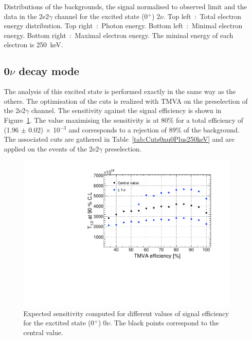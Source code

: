 \documentclass[main.tex]{subfiles}
\begin{document}
Distributions of the backgrounds, the signal normalised to observed limit and the data in the 2e2$\gamma$ channel for the excited state (0$^+$) 2$\nu$. Top left~:~Total electron energy distribution. Top right~:~Photon energy. Bottom left~:~Minimal electron energy. Bottom right~:~Maximal electron energy. The mininal energy of each electron is 250~keV.


\FloatBarrier


\subsection{0$\nu$ decay mode}\label{Analysisbb0nu0}


\NI The analysis of this excited state is performed exactly in the same way as the others. The optimisation of the cuts is realized with TMVA on the preselection of the 2e2$\gamma$ channel. The sensitivity against the signal efficiency is shown in Figure~\ref{plot:SensVsEffbb0nu0_250}. The value maximising the sensitivity is at 80\% for a total efficiency of (1.96 $\pm$ 0.02) $\times$ 10$^{-\text{3}}$ and corresponds to a rejection of 89\% of the background. The associated cuts are gathered in Table~\ref{tab:Cuts0nu0Plus250keV} and are applied on the events of the 2e2$\gamma$ preselection.


\begin{figure} [h!]
\begin{center}
\includegraphics[scale=0.55]{pictures/FinalResults/bb0nu0/SensVsEff_bb0nu0_250_v2.pdf}
\end{center}
\caption{Expected sensitivity computed for different values of signal efficiency for the exctited state (0$^+$) 0$\nu$. The black points correspond to the central value.}
\label{plot:SensVsEffbb0nu0_250}
\end{figure}
\end{document}
